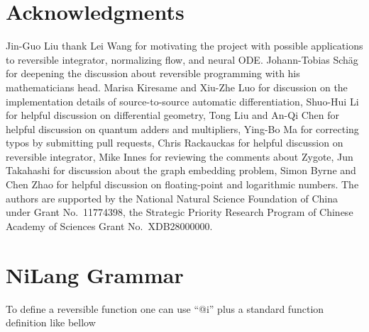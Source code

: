 \documentclass{article}
\newcommand{\<}{\langle}
\renewcommand{\>}{\rangle}
\newcommand{\blue}[1]{[{\bf  \color{blue}{JG: #1}}]}
\theoremstyle{definition}\newtheorem{definition}{\textit{Definition}}
\begin{document}

\section{Acknowledgments}
Jin-Guo Liu thank Lei Wang for motivating the project with possible applications to reversible integrator, normalizing flow, and neural ODE.
Johann-Tobias Schäg for deepening the discussion about reversible programming with his mathematicians head.
Marisa Kiresame and Xiu-Zhe Luo for discussion on the implementation details of source-to-source automatic differentiation,
Shuo-Hui Li for helpful discussion on differential geometry, Tong Liu and An-Qi Chen for helpful discussion on quantum adders and multipliers, Ying-Bo Ma for correcting typos by submitting pull requests, Chris Rackauckas for helpful discussion on reversible integrator, Mike Innes for reviewing the comments about Zygote, Jun Takahashi for discussion about the graph embedding problem, Simon Byrne and Chen Zhao for helpful discussion on floating-point and logarithmic numbers.
The authors are supported by the National Natural Science Foundation of China under Grant No.~11774398, the Strategic Priority Research Program of Chinese Academy of Sciences Grant No.~XDB28000000.




\newpage
\appendix

\section{NiLang Grammar}\label{app:grammar}

To define a reversible function one can use ``@i'' plus a standard function definition like bellow
\end{document}
